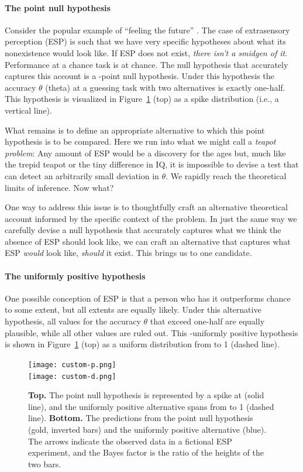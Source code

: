 \paragraph{The point null hypothesis} 

Consider the popular example of ``feeling the future'' \cite{Bem2011}.  The case of extrasensory perception (ESP) is such that we have very specific hypotheses about what its nonexistence would look like.  If ESP does not exist, \emph{there isn't a smidgen of it}. Performance at a chance task is at chance. The null hypothesis that accurately captures this account is a \hyp{point null hypothesis}. Under this hypothesis the accuracy $\theta$ (theta) at a guessing task with two alternatives is exactly one-half. This hypothesis is visualized in Figure~\ref{fig:pv} (top) as a spike distribution (i.e., a vertical line). 

What remains is to define an appropriate alternative to which this point hypothesis is to be compared.  Here we run into what we might call a \emph{teapot problem}: Any amount of ESP would be a discovery for the ages but, much like the trepid teapot or the tiny difference in IQ, it is impossible to devise a test that can detect an arbitrarily small deviation in $\theta$. We rapidly reach the theoretical limits of inference. Now what?

One way to address this issue is to thoughtfully craft an alternative theoretical account informed by the specific context of the problem. In just the same way we carefully devise a null hypothesis that accurately captures what we think the absence of ESP should look like, we can craft an alternative that captures what ESP \emph{would} look like, \emph{should} it exist.  This brings us to one candidate.

\paragraph{The uniformly positive hypothesis} One possible conception of ESP is that a person who has it outperforms chance to some extent, but all extents are equally likely. Under this alternative hypothesis, all values for the accuracy $\theta$ that exceed one-half are equally plausible, while all other values are ruled out. This \hyp{uniformly positive hypothesis} is shown in Figure~\ref{fig:pv} (top) as a uniform distribution from \textonehalf{} to 1 (dashed line).  

\begin{figure}[tb]
\texttt{[image: custom-p.png]}\\
\texttt{[image: custom-d.png]}
\caption{\textbf{Top.} The point null hypothesis is represented by a spike at \textonehalf{} (solid line), and the uniformly positive alternative spans from \textonehalf{} to 1 (dashed line). \textbf{Bottom.} The predictions from the point null hypothesis (gold, inverted bars) and the uniformly positive alternative (blue). The arrows indicate the observed data in a fictional ESP experiment, and the Bayes factor is the ratio of the heights of the two bars.}\label{fig:pv}
\end{figure}

